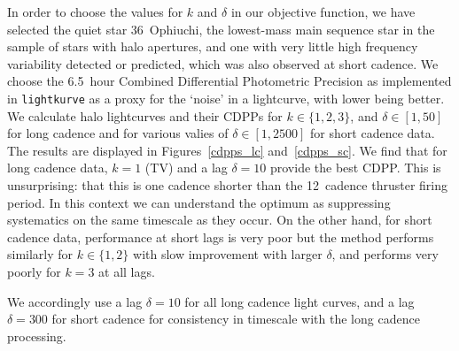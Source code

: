 \documentclass[modern]{aastex62}
\begin{document}
In order to choose the values for $k$ and $\delta$ in our objective function, we have selected the quiet star 36~Ophiuchi, the lowest-mass main sequence star in the sample of stars with halo apertures, and one with very little high frequency variability detected or predicted, which was also observed at short cadence. We choose the 6.5~hour Combined Differential Photometric Precision \citep[CDPP,][]{cdpp} as implemented in \texttt{lightkurve} \citep{lightkurve} as a proxy for the `noise' in a lightcurve, with lower being better. We calculate halo lightcurves and their CDPPs for $k \in \{1,2,3\}$, and $\delta \in [1,50]$ for long cadence and for various valies of $\delta \in [1,2500]$ for short cadence data. The results are displayed in Figures~\ref{cdpps_lc} and~\ref{cdpps_sc}. We find that for long cadence data, $k=1$ (TV) and a lag $\delta=10$ provide the best CDPP. This is unsurprising: that this is one cadence shorter than the 12~cadence thruster firing period. In this context we can understand the optimum as suppressing systematics on the same timescale as they occur. On the other hand, for short cadence data, performance at short lags is very poor but the method performs similarly for $k \in \{1,2\}$ with slow improvement with larger $\delta$, and performs very poorly for $k=3$ at all lags. 

We accordingly use a lag $\delta=10$ for all long cadence light curves, and a lag $\delta=300$ for short cadence for consistency in timescale with the long cadence processing.



\end{document}
